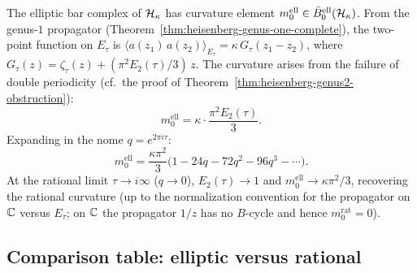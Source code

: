 \begin{computation}\label{comp:ell-curvature}
The elliptic bar complex of $\mathcal{H}_\kappa$ has curvature
element $m_0^{\mathrm{ell}} \in \bar{B}^{\mathrm{ell}}_0(\mathcal{H}_\kappa)$.
From the genus-$1$ propagator
(Theorem~\ref{thm:heisenberg-genus-one-complete}), the
two-point function on $E_\tau$ is $\langle a(z_1)\,a(z_2)
\rangle_{E_\tau} = \kappa\,G_\tau(z_1 - z_2)$, where
$G_\tau(z) = \zeta_\tau(z) + (\pi^2 E_2(\tau)/3)\,z$.
The curvature arises from the failure of double periodicity
(cf.\ the proof of
Theorem~\ref{thm:heisenberg-genus2-obstruction}):
\begin{equation}\label{eq:ell-curvature}
m_0^{\mathrm{ell}}
= \kappa \cdot \frac{\pi^2 E_2(\tau)}{3}.
\end{equation}
Expanding in the nome $q = e^{2\pi i \tau}$:
\begin{equation}\label{eq:ell-curvature-q}
m_0^{\mathrm{ell}}
= \frac{\kappa\pi^2}{3}\bigl(
1 - 24q - 72q^2 - 96q^3 - \cdots
\bigr).
\end{equation}
At the rational limit $\tau \to i\infty$ ($q \to 0$),
$E_2(\tau) \to 1$ and $m_0^{\mathrm{ell}} \to
\kappa\pi^2/3$, recovering the rational curvature
(up to the normalization convention for the propagator
on $\mathbb{C}$ versus $E_\tau$; on $\mathbb{C}$ the propagator
$1/z$ has no $B$-cycle and hence $m_0^{\mathrm{rat}} = 0$).
\end{computation}

\subsection{Comparison table: elliptic versus rational}
\label{subsec:ell-vs-rat-table}

